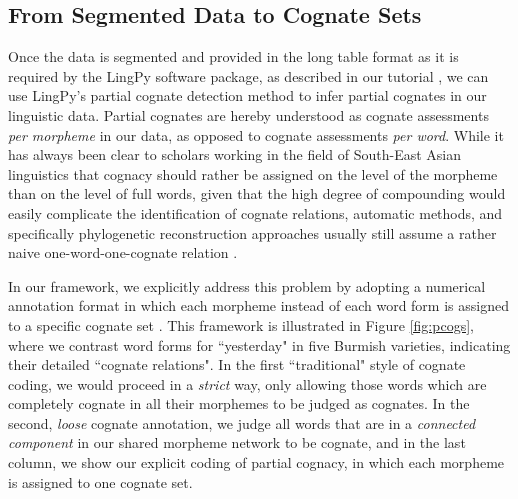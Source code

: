 \documentclass[xetex,svgnames]{scrartcl}
\begin{document}
\subsection{From Segmented Data to Cognate Sets}\label{sec:pcogs}

Once the data is segmented and provided in the long table format as it is required by the LingPy
software package, as described in our tutorial \citep{List2018f}, we can use LingPy's partial
cognate detection method to infer partial cognates in our linguistic data. Partial cognates are
hereby understood as cognate assessments \emph{per morpheme} in our data, as opposed to cognate
assessments \emph{per word}. 
While it has always been clear to scholars working in the field of South-East Asian linguistics that
cognacy should rather be assigned on the level of the morpheme than on the level of full words,
given that the high degree of compounding would easily complicate the identification of cognate
relations, automatic methods, and specifically phylogenetic reconstruction approaches usually still
assume a rather naive one-word-one-cognate relation \citep{List2016f}. 

In our framework, we explicitly address this problem by adopting a numerical annotation format in
which each morpheme instead of each word form is assigned to a specific cognate set
\citep{Hill2017a}. This framework is illustrated in Figure \ref{fig:pcogs}, where we contrast word
forms for ``yesterday" in five Burmish varieties, indicating their detailed ``cognate relations". 
In the first ``traditional" style of cognate coding, we would proceed in a \emph{strict} way, only
allowing those words which are completely cognate in all their morphemes to be judged as cognates.
In the second, \emph{loose} cognate annotation, we judge all words that are in a \emph{connected
component} in our shared morpheme network to be cognate, and in the last column, we show our
explicit coding of partial cognacy, in which each morpheme is assigned to one cognate set.
\end{document}
